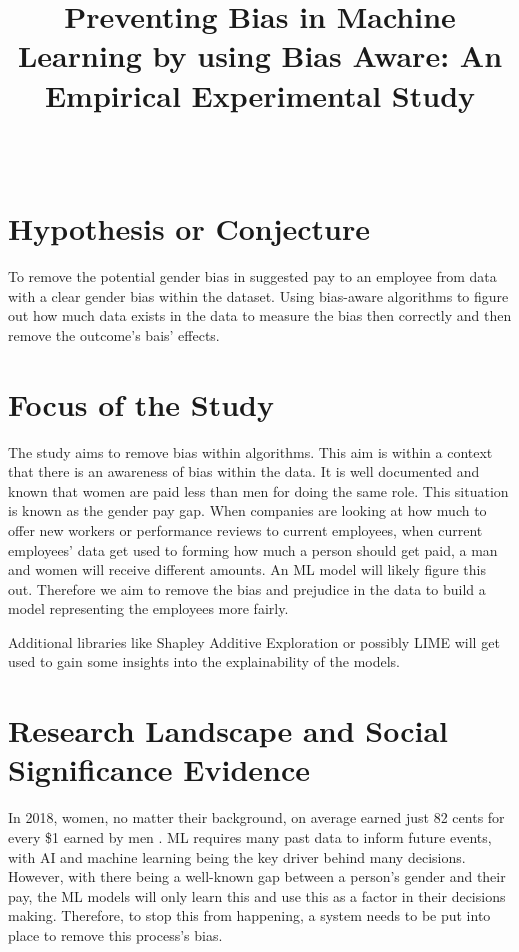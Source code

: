\documentclass{sigchi}
\def\plaintitle{Preventing Bias in Machine Learning by using Bias Aware: An Empirical Experimental Study}
\begin{document}
\title{\plaintitle}

\author{%
  \\
}

\maketitle

 





\section{Hypothesis or Conjecture}
To remove the potential gender bias in suggested pay to an employee from data with a clear gender bias within the dataset. Using bias-aware algorithms to figure out how much data exists in the data to measure the bias then correctly and then remove the outcome's bais' effects.

\section{Focus of the Study}
The study aims to remove bias within algorithms. This aim is within a context that there is an awareness of bias within the data. It is well documented and known that women are paid less than men for doing the same role. This situation is known as the gender pay gap. When companies are looking at how much to offer new workers or performance reviews to current employees, when current employees' data get used to forming how much a person should get paid, a man and women will receive different amounts. An ML model will likely figure this out. Therefore we aim to remove the bias and prejudice in the data to build a model representing the employees more fairly.

Additional libraries like Shapley Additive Exploration or possibly LIME will get used to gain some insights into the explainability of the models.
 

\section{Research Landscape and Social Significance Evidence}
In 2018, women, no matter their background, on average earned just 82 cents for every \$1 earned by men \cite{paygapfacts}. ML requires many past data to inform future events, with AI and machine learning being the key driver behind many decisions. However, with there being a well-known gap between a person's gender and their pay, the ML models will only learn this and use this as a factor in their decisions making. Therefore, to stop this from happening, a system needs to be put into place to remove this process's bias. 
\end{document}
